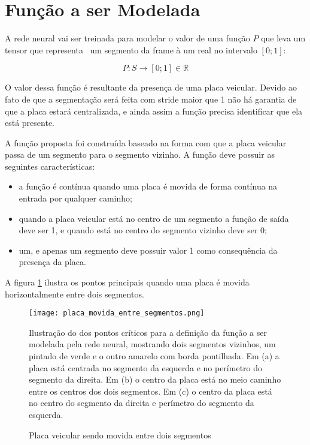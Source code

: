 \section{Função a ser Modelada} \label{ses:funcao_a_modelar}

A rede neural vai ser treinada para modelar o valor de uma função $P$ que
leva um tensor que representa  um segmento da frame à um real no intervalo
$[0;1]$:

\begin{equation}
	P:S \to [0;1] \in \mathbb{R} 
\end{equation}

O valor dessa função é resultante da presença de uma placa veicular. Devido ao
fato de que a segmentação será feita com stride maior que 1 não há garantia de
que a placa estará centralizada, e ainda assim a função precisa identificar que
ela está presente.

A função proposta foi construída baseado na forma com que a placa veicular
passa de um segmento para o segmento vizinho. A função deve possuir as
seguintes características:

\begin{itemize}
\item a função é contínua quando uma placa é movida de forma contínua na
	entrada por qualquer caminho;
\item quando a placa veicular está no centro de um segmento a função de
	saída deve ser 1, e quando está no centro do segmento vizinho deve ser 0;
\item um, e apenas um segmento deve possuir valor 1 como consequência da
	presença da placa.
\end{itemize}

A figura \ref{fig:placa_movida_entre_segmentos} ilustra os pontos principais
quando uma placa é movida horizontalmente entre dois segmentos.

\begin{figure}[!htb]
	\centering
	\texttt{[image: placa\_movida\_entre\_segmentos.png]}
	\caption{Placa veicular sendo movida entre dois segmentos}
	\label{fig:placa_movida_entre_segmentos}
	Ilustração do dos pontos críticos para a definição da função a ser modelada
	pela rede neural, mostrando dois segmentos vizinhos, um pintado de verde e
	o outro amarelo com borda pontilhada. Em (a) a placa está centrada no
	segmento da esquerda e no perímetro do segmento da direita.
	Em (b) o centro da placa está no meio caminho entre os centros dos dois
	segmentos. Em (c) o centro da placa está no centro do segmento da direita e
	perímetro do segmento da esquerda.
\end{figure}

